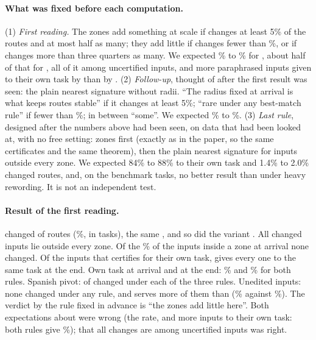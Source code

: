 \paragraph{What was fixed before each computation.} (1) \emph{First reading.} The zones add something at scale if \nearest{} changes at least 5\% of the routes and \cert{} at most half as many; they add little if
\nearest{} changes fewer than \RerouteLimitLow{}\%, or if \cert{} changes more than three quarters as many. We expected \RerouteExpectNearLow{}\% to \RerouteExpectNearHigh{}\% for \nearest{}, about half of that for \cert{}, all of it among
uncertified inputs, and more paraphrased inputs given to their own task by \nearest{} than by \cert{}. (2) \emph{Follow-up}, thought of after the first result was seen: the plain nearest signature without radii. ``The radius fixed at arrival is what keeps routes stable'' if it changes at least 5\%;
``rare under any best-match rule'' if fewer than \RerouteLimitLow{}\%; in between ``some''. We expected \RerouteExpectSigLow{}\% to \RerouteExpectSigHigh{}\%. (3) \emph{Last rule}, designed after the numbers above had been seen, on data that had been looked at, with no free setting:
zones first (exactly as in the paper, so the same certificates and the same theorem), then the plain nearest signature for inputs outside every zone. We expected 84\% to 88\% to their own task and 1.4\% to 2.0\% changed routes, and, on the benchmark tasks, no better result
than \cert{} under heavy rewording. It is not an independent test.

\paragraph{Result of the first reading.} \nearest{} changed \RerouteNearNChanged{} of \RerouteInputs{} routes (\RerouteNearChanged{}\%, in \RerouteNearTasks{} tasks), \cert{} the same \RerouteCertNChanged{}, and so did the variant \exactfirst{}. All changed inputs lie
outside every zone. Of the \RerouteCertInZone{}\% of the inputs inside a zone at arrival none changed. Of the \RerouteCertOwn{} inputs that \cert{} certifies for their own task, \nearest{} gives every one to the same task at the end. Own task at arrival and at the end:
\RerouteCertOwnStart{}\% and \RerouteCertOwnEnd{}\% for both rules. Spanish pivot: \RerouteCertEsNChanged{} of \RerouteInputsPivot{} changed under each of the three rules. Unedited inputs: none changed under any rule, and \nearest{} serves more of them than \cert{}
(\RerouteNearUnOwn{}\% against \RerouteCertUnOwn{}\%). The verdict by the rule fixed in advance is ``the zones add little here''. Both expectations about \nearest{} were wrong (the rate, and more inputs to their own task: both rules give \RerouteCertOwnEnd{}\%); that all changes are among uncertified inputs was right.

